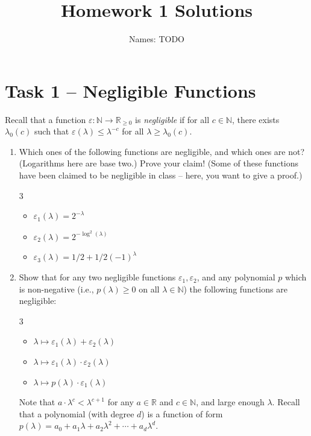 \documentclass[11pt]{article}
\renewcommand{\epsilon}{\varepsilon}
\newcommand{\bbN}{\mathbb{N}}
\newcommand{\bbR}{\mathbb{R}}
\theoremstyle{plain}
\theoremstyle{definition}
\begin{document}
\title{{\bf Homework 1 Solutions} }
\author{Names: TODO}
\date{}

\maketitle

\section*{Task 1 -- Negligible Functions}

\noindent Recall that a function $\epsilon: \bbN \to \bbR_{\ge 0}$ is {\em
  negligible} if for all $c \in \bbN$, there exists $\lambda_0(c)$ such that
$\epsilon(\lambda) \leq \lambda^{-c}$ for all $\lambda \ge \lambda_0(c)$.

\begin{enumerate}
\item Which ones of the following functions are negligible, and which
  ones are not? (Logarithms here are base two.) Prove your claim! (Some of these functions have been
  claimed to be negligible in class -- here, you want to give a proof.)
\begin{multicols}{3}
\begin{itemize}
  \item $\epsilon_1(\lambda) = 2^{-\lambda}$
  \item $\epsilon_2(\lambda) = 2^{-\log^2(\lambda)}$
  \item $\epsilon_3(\lambda) = 1/2 + 1/2(-1)^\lambda$
\end{itemize}
\end{multicols}

\item  Show that for any two negligible functions $\epsilon_1, \epsilon_2$,
  and any polynomial $p$ which is non-negative (i.e., $p(\lambda) \geq 0$ on
  all $\lambda \in \bbN$) the following functions are negligible:
  \begin{multicols}{3}
    \begin{itemize}
      \item $\lambda \mapsto \epsilon_1(\lambda) + \epsilon_2(\lambda)$
      \item $\lambda \mapsto \epsilon_1(\lambda) \cdot \epsilon_2(\lambda)$
      \item $\lambda \mapsto p(\lambda) \cdot \epsilon_1(\lambda)$
    \end{itemize}
   \end{multicols}
    Note that $a \cdot \lambda^c < \lambda^{c+1}$ for any $a
   \in \mathbb{R}$ and $c \in \bbN$, and large enough $\lambda$. Recall that
   a polynomial (with degree $d$) is a function of form $p(\lambda) = a_0 +
   a_1 \lambda + a_2 \lambda^2 + \cdots + a_d \lambda^d$.
 \end{enumerate}
\end{document}
